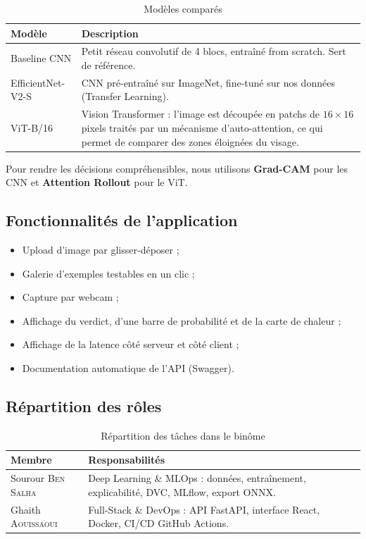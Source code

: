 \documentclass[11pt,a4paper]{article}
\newcommand{\etudiantA}{Sourour \textsc{Ben Salha}}
\newcommand{\etudiantB}{Ghaith \textsc{Aouissaoui}}
\begin{document}
\begin{table}[H]
\centering
\caption{Modèles comparés}
\small
\begin{tabularx}{\linewidth}{@{}lX@{}}
\toprule
\textbf{Modèle} & \textbf{Description} \\
\midrule
Baseline CNN & Petit réseau convolutif de 4 blocs, entraîné from scratch. Sert de référence. \\
EfficientNet-V2-S & CNN pré-entraîné sur ImageNet, fine-tuné sur nos données (Transfer Learning). \\
ViT-B/16 & Vision Transformer : l'image est découpée en patchs de $16\times16$ pixels traités par
un mécanisme d'auto-attention, ce qui permet de comparer des zones éloignées du visage. \\
\bottomrule
\end{tabularx}
\end{table}

Pour rendre les décisions compréhensibles, nous utilisons \textbf{Grad-CAM} pour les CNN et
\textbf{Attention Rollout} pour le ViT.

\subsection{Fonctionnalités de l'application}
\begin{itemize}
  \item Upload d'image par glisser-déposer ;
  \item Galerie d'exemples testables en un clic ;
  \item Capture par webcam ;
  \item Affichage du verdict, d'une barre de probabilité et de la carte de chaleur ;
  \item Affichage de la latence côté serveur et côté client ;
  \item Documentation automatique de l'API (Swagger).
\end{itemize}

\subsection{Répartition des rôles}

\begin{table}[H]
\centering
\caption{Répartition des tâches dans le binôme}
\small
\begin{tabularx}{\linewidth}{@{}p{3.8cm}X@{}}
\toprule
\textbf{Membre} & \textbf{Responsabilités} \\
\midrule
\etudiantA & Deep Learning \& MLOps : données, entraînement, explicabilité, DVC, MLflow, export ONNX. \\
\etudiantB & Full-Stack \& DevOps : API FastAPI, interface React, Docker, CI/CD GitHub Actions. \\
\bottomrule
\end{tabularx}
\end{table}
\end{document}
